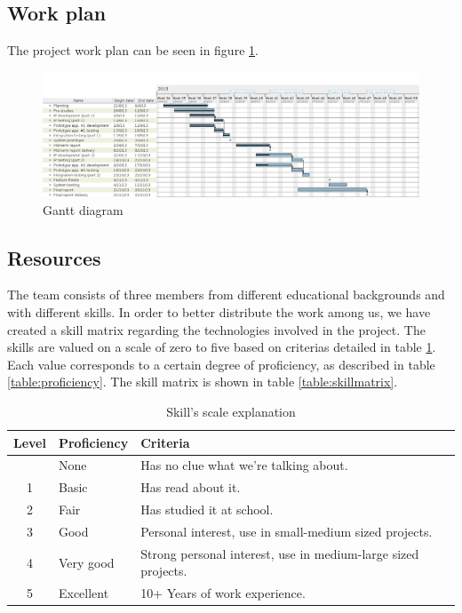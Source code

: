 \subsection{Work plan}
\label{section:workplan}

The project work plan can be seen in figure \ref{figure:work-splan}.

\newpage
\begin{landscape}
\begin{figure}[h]
\includegraphics[scale=0.66]{../Figures/gantt-diagram.png}
\caption{Gantt diagram}
\label{figure:work-splan}
\end{figure}
\end{landscape}


\subsection{Resources}
\label{section:resources}
The team consists of three members from different educational backgrounds and with different skills.
In order to better distribute the work among us, we have created a skill matrix regarding the technologies involved in the project.
The skills are valued on a scale of zero to five based on criterias detailed in table \ref{table:skillscale}.
Each value corresponds to a certain degree of proficiency, as described in table \ref{table:proficiency}.
The skill matrix is shown in table \ref{table:skillmatrix}.

\begin{table}[h]
\begin{center}
\begin{tabular}{ | c | l | l | }
  \hline
  Level & Proficiency & Criteria \\
  \hline\noalign{\smallskip}\noalign{\smallskip}\hline
  0 & None		& Has no clue what we're talking about. \\
  1 & Basic		& Has read about it.\\
  2 & Fair		& Has studied it at school.\\
  3 & Good		& Personal interest, use in small-medium sized projects.\\
  4 & Very good	& Strong personal interest, use in medium-large sized projects. \\
  5 & Excellent	& 10+ Years of work experience. \\
  \hline
\end{tabular}
\end{center}
\caption{Skill's scale explanation}
\label{table:skillscale}
\end{table}

